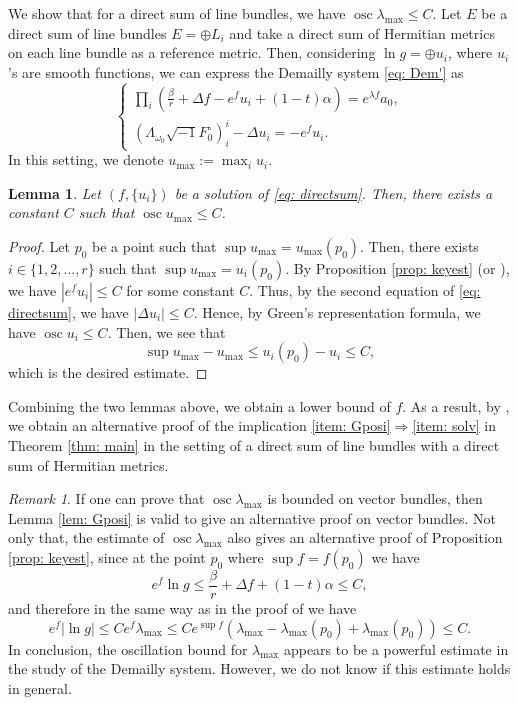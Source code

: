 \documentclass[a4, 12pt, 
]{amsart}
\numberwithin{equation}{section}
\theoremstyle{plain}
\newtheorem{lem}[equation]{Lemma}
\theoremstyle{definition}
\theoremstyle{remark}
\newtheorem{rem}[equation]{Remark}
\begin{document}
We show that for a direct sum of line bundles, we have $\operatorname{osc} \lambda_{\mathrm{max}}\le C$.
Let $E$ be a direct sum of line bundles $E=\oplus L_i$ and take a direct sum of Hermitian metrics on each line bundle as a reference metric. Then, considering $\ln g=\oplus u_i$, where $u_i$'s are smooth functions, we can express the Demailly system \eqref{eq: Dem'} as 
\begin{equation}\label{eq: directsum}
    \begin{cases}
       \prod_i \left(\frac{\beta}{r}+\Delta f-e^f u_i+(1-t)\alpha\right)=e^{\lambda f}a_0,\\
        \left(\Lambda_{\omega_0}\sqrt{-1}F_0^\circ\right)^i_i-\Delta u_i=-e^f u_i.
    \end{cases}
\end{equation}
In this setting, we denote $u_{\mathrm{max}}:=\max_i u_i$.

\begin{lem}\label{lem: osc}
    Let $(f,\{u_i\})$ be a solution of \eqref{eq: directsum}. Then, there exists a constant $C$ such that $\operatorname{osc} u_\mathrm{max}\le C$.
\end{lem}

\begin{proof}
   Let $p_0$ be a point such that $\sup u_{\mathrm{max}}=u_{\mathrm{max}}(p_0)$. Then, there exists $i\in \{1,2,\dots,r\}$ such that $\sup u_{\mathrm{max}}=u_i(p_0)$. By Proposition \ref{prop: keyest} (or \cite[Proposition 3.2]{Pin23}), we have $|e^fu_i|\le C$ for some constant $C$. Thus, by the second equation of \eqref{eq: directsum}, we have $|\Delta u_i|\le C$.
   Hence, by Green's representation formula, we have $\operatorname{osc} u_i\le C$. Then, we see that
   $$\sup u_{\mathrm{max}}-u_{\mathrm{max}}\le u_i(p_0)-u_i\le C,$$
   which is the desired estimate. 
\end{proof}

Combining the two lemmas above, we obtain a lower bound of $f$. As a result, by \cite[Theorem 1.2]{Pin23}, we obtain an alternative proof of the implication \eqref{item: Gposi}$\Rightarrow$\eqref{item: solv} in Theorem \ref{thm: main} in the setting of a direct sum of line bundles with a direct sum of Hermitian metrics.

\begin{rem}
    If one can prove that $\operatorname{osc} \lambda_{\mathrm{max}}$ is bounded on vector bundles, then Lemma \ref{lem: Gposi} is valid to give an alternative proof on vector bundles. Not only that, the estimate of $\operatorname{osc} \lambda_{\mathrm{max}}$ also gives an alternative proof of Proposition \ref{prop: keyest}, since at the point $p_0$ where $\sup f=f(p_0)$ we have
    $$e^f\ln g\le \frac{\beta}{r}+\Delta f+(1-t)\alpha\le C,$$
    and therefore in the same way as in the proof of \cite[Proposition 3.2]{Pin23} we have
    $$e^f|\ln g|\le Ce^f\lambda_{\mathrm{max}}\le Ce^{\sup f}(\lambda_{\mathrm{max}}-\lambda_{\mathrm{max}}(p_0)+\lambda_{\mathrm{max}}(p_0))\le C.$$
    In conclusion, the oscillation bound for $\lambda_{\mathrm{max}}$ appears to be a powerful estimate in the study of the Demailly system. However, we do not know if this estimate holds in general. 
\end{rem}
\end{document}
